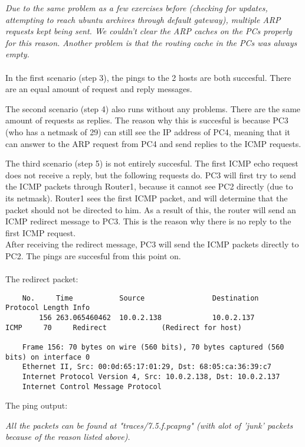 \textit{Due to the same problem as a few exercises before (checking for updates, attempting to reach ubuntu archives through default gateway), multiple ARP requests kept being sent. We couldn't clear the ARP caches on the PCs properly for this reason. Another problem is that the routing cache in the PCs was always empty.}
\\ \\
In the first scenario (step 3), the pings to the 2 hosts are both succesful. There are an equal amount of request and reply messages.


The second scenario (step 4) also runs without any problems. There are the same amount of requests as replies. The reason why this is succesful is because PC3 (who has a netmask of 29) can still see the IP address of PC4, meaning that it can answer to the ARP request from PC4 and send replies to the ICMP requests.



The third scenario (step 5) is not entirely succesful. The first ICMP echo request does not receive a reply, but the following requests do. PC3 will first try to send the ICMP packets through Router1, because it cannot see PC2 directly (due to its netmask). Router1 sees the first ICMP packet, and will determine that the packet should not be directed to him. As a result of this, the router will send an ICMP redirect message to PC3. This is the reason why there is no reply to the first ICMP request. \\
After receiving the redirect message, PC3 will send the ICMP packets directly to PC2. The pings are succesful from this point on. \\ \\

The redirect packet:
\begin{verbatim}
	No.     Time           Source                Destination           Protocol Length Info
	    156 263.065460462  10.0.2.138            10.0.2.137            ICMP     70     Redirect             (Redirect for host)

	Frame 156: 70 bytes on wire (560 bits), 70 bytes captured (560 bits) on interface 0
	Ethernet II, Src: 00:0d:65:17:01:29, Dst: 68:05:ca:36:39:c7
	Internet Protocol Version 4, Src: 10.0.2.138, Dst: 10.0.2.137
	Internet Control Message Protocol
\end{verbatim}
The ping output:


\textit{All the packets can be found at "traces/7.5.f.pcapng" (with alot of 'junk' packets because of the reason listed above).}